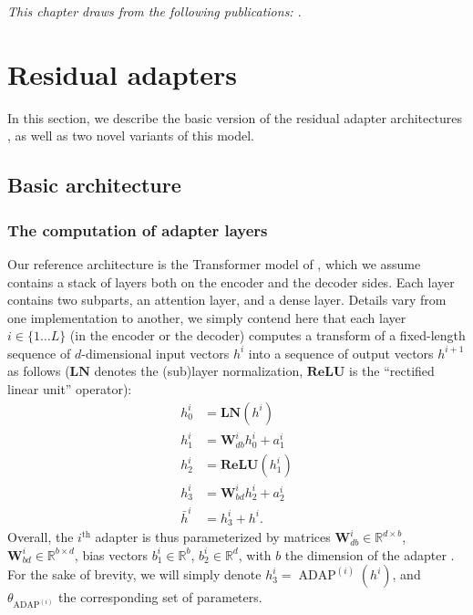 \textit{This chapter draws from the following publications: \citet{Pham20Study}}.
\section{Residual adapters \label{sec:res-chap6}}
In this section, we describe the basic version of the residual adapter architectures \citep{houlsby19parameter, Bapna19simple}, as well as two novel variants of this model.

\subsection{Basic architecture \label{ssec:architecture-chap6}}

\subsubsection{The computation of adapter layers}
Our reference architecture is the Transformer model of \citet{Vaswani17attention}, which we assume contains a stack of layers both on the encoder and the decoder sides. Each layer contains two subparts, an attention layer, and a dense layer. Details vary from one implementation to another, we simply contend here that each layer $i \in \{1 \dots L\}$ (in the encoder or the decoder) computes a transform of a fixed-length sequence of $d$-dimensional input vectors $h^{i}$ into a sequence of output vectors $h^{i+1}$ as follows ($\mathbf{LN}$ denotes the (sub)layer normalization, $\mathbf{ReLU}$ is the ``rectified linear unit'' operator):
\begin{align*}
  h^{i}_0 &= \mathbf{LN}(h^{i}) \\
  h^{i}_1 &= \mathbf{W}_{db}^{i}h_0^{i} + a^i_{1} \\
  h^{i}_2 &= \mathbf{ReLU}(h_1^{i})
  \\
  h^{i}_3 &= \mathbf{W}_{bd}^{i}h_2^{i} + a^i_{2} \\
  \bar{h}^{i} &= h^{i}_3 + h^i.
\end{align*}
Overall, the  $i^{\text{th}}$ adapter is thus parameterized by matrices $\displaystyle{\mathbf{W}_{db}^{i}\in\mathbb{R}^{d\times b}}$,$\displaystyle{\mathbf{W}_{bd}^{i}\in\mathbb{R}^{b\times d}}$, bias vectors $\displaystyle{b^i_{1} \in \mathbb{R}^{b}}$, $\displaystyle{b^i_{2} \in \mathbb{R}^{d}}$, with $b$ the dimension of the adapter . For the sake of brevity, we will simply denote $h^{i}_3 = \operatorname{ADAP}^{(i)}(h^i)$, and $\theta_{\operatorname{ADAP}^{(i)}}$ the corresponding set of parameters.

